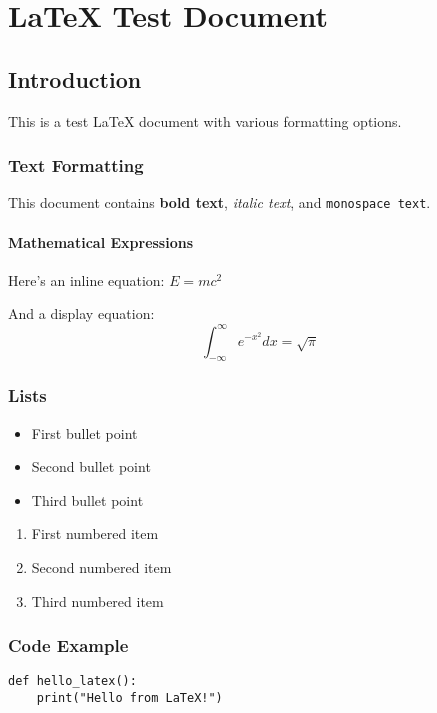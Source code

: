 \documentclass{article}
\begin{document}
\chapter{LaTeX Test Document}

\section{Introduction}

This is a test LaTeX document with various formatting options.

\subsection{Text Formatting}

This document contains \textbf{bold text}, \textit{italic text}, and \texttt{monospace text}.

\subsubsection{Mathematical Expressions}

Here's an inline equation: $E = mc^2$

And a display equation:
\[
\int_{-\infty}^{\infty} e^{-x^2} dx = \sqrt{\pi}
\]

\subsection{Lists}

\begin{itemize}
\item First bullet point
\item Second bullet point
\item Third bullet point
\end{itemize}

\begin{enumerate}
\item First numbered item
\item Second numbered item
\item Third numbered item
\end{enumerate}

\subsection{Code Example}

\begin{verbatim}
def hello_latex():
    print("Hello from LaTeX!")
\end{verbatim}
\end{document}
